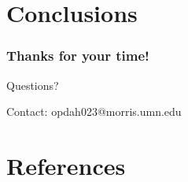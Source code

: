 \documentclass{beamer}
\newcommand{\linespace}{\vskip 0.25cm}
\begin{document}
\begin{frame}
\end{frame}



\section[Conclusions]{Conclusions}

\begin{frame}
	\frametitle{Thanks for your time!}
	
	\begin{center}
	{\huge Questions?}
	\end{center}	
	
	\linespace
	\linespace	
	
	\begin{center}
	Contact: opdah023@morris.umn.edu
	\end{center}
	
\end{frame}



\section*{References}
\end{document}
